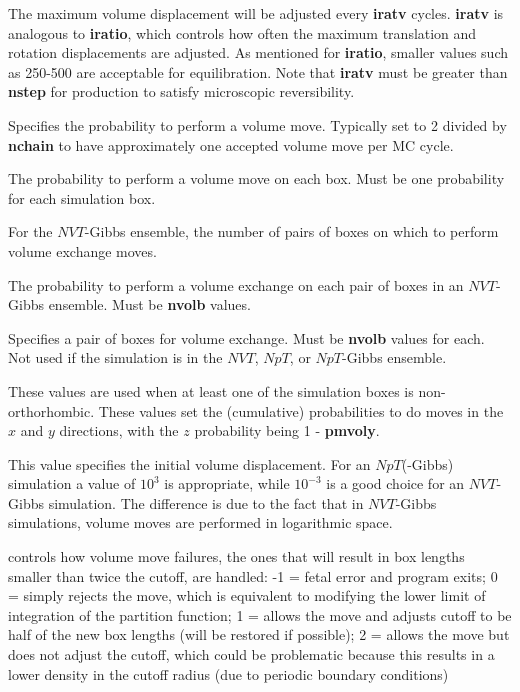 \documentclass[12pt,letterpaper]{article}
\begin{document}
 The maximum volume displacement will
be adjusted every {\bf iratv} cycles. {\bf iratv} is
analogous to {\bf iratio}, which controls how often the
maximum translation and rotation displacements are adjusted.
As mentioned for {\bf iratio}, smaller values such as
250-500 are acceptable for equilibration. Note that {\bf
  iratv} must be greater than {\bf nstep} for production to
satisfy microscopic reversibility.

 Specifies the probability to perform a
volume move. Typically set to 2 divided by {\bf nchain} to
have approximately one accepted volume move per MC cycle.

 The probability to perform a volume
move on each box. Must be one probability for each
simulation box.

 For the $NVT$-Gibbs ensemble, the
number of pairs of boxes on which to perform volume exchange
moves.

 The probability to perform a volume
exchange on each pair of boxes in an $NVT$-Gibbs ensemble.
Must be {\bf nvolb} values.

 Specifies a pair of boxes for
volume exchange. Must be {\bf nvolb} values for each. Not
used if the simulation is in the $NVT$, $NpT$, or
$NpT$-Gibbs ensemble.

 These values are used when at
least one of the simulation boxes is non-orthorhombic. These
values set the (cumulative) probabilities to do moves in the
$x$ and $y$ directions, with the $z$ probability being 1 -
{\bf pmvoly}.

 This value specifies the initial
volume displacement. For an $NpT$(-Gibbs) simulation a value
of $10^3$ is appropriate, while $10^{-3}$ is a good choice
for an $NVT$-Gibbs simulation. The difference is due to the
fact that in $NVT$-Gibbs simulations, volume moves are
performed in logarithmic space.

 controls how volume
move failures, the ones that will result in box lengths
smaller than twice the cutoff, are handled: -1 = fetal error
and program exits; 0 = simply rejects the move, which is
equivalent to modifying the lower limit of integration of
the partition function; 1 = allows the move and adjusts
cutoff to be half of the new box lengths (will be restored
if possible); 2 = allows the move but does not adjust the
cutoff, which could be problematic because this results in a
lower density in the cutoff radius (due to periodic boundary
conditions)
\end{document}

